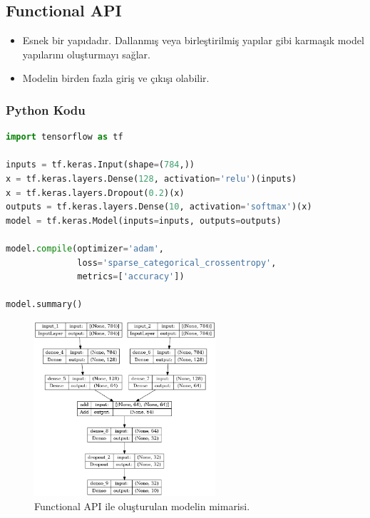 \newpage

\subsection{Functional API}
\begin{itemize}
    \item Esnek bir yapıdadır. Dallanmış veya birleştirilmiş yapılar gibi karmaşık model yapılarını oluşturmayı sağlar.
    \item Modelin birden fazla giriş ve çıkışı olabilir.
\end{itemize}

\subsubsection{Python Kodu}

\begin{lstlisting}[language=Python]
import tensorflow as tf

inputs = tf.keras.Input(shape=(784,))
x = tf.keras.layers.Dense(128, activation='relu')(inputs)
x = tf.keras.layers.Dropout(0.2)(x)
outputs = tf.keras.layers.Dense(10, activation='softmax')(x)
model = tf.keras.Model(inputs=inputs, outputs=outputs)

model.compile(optimizer='adam',
              loss='sparse_categorical_crossentropy',
              metrics=['accuracy'])

model.summary()
\end{lstlisting}

\begin{figure}[ht]
    \centering
    \includegraphics[width=0.6\textwidth]{images/functional_model.png}
    \caption{Functional API ile oluşturulan modelin mimarisi.}
    \label{fig:enter-label}
\end{figure}

\newpage